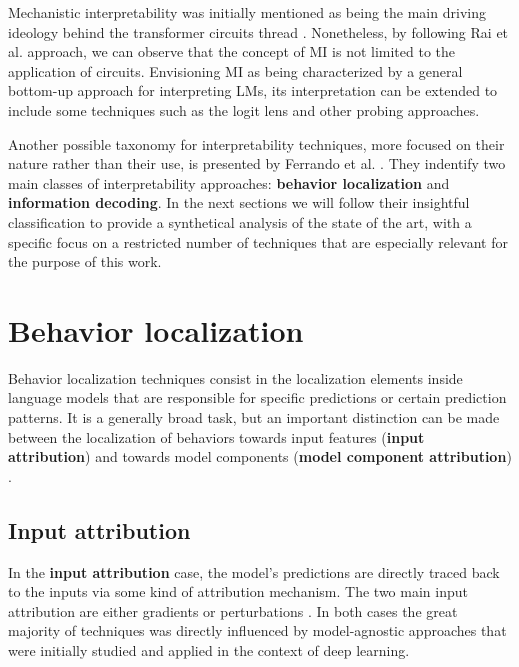 Mechanistic interpretability was initially mentioned as being the main driving ideology behind the transformer circuits thread .
Nonetheless, by following Rai et al.  approach, we can observe that the concept of MI is not limited to the application of circuits.
Envisioning MI as being characterized by a general bottom-up approach for interpreting LMs, its interpretation can be extended to include some  techniques such as the logit lens  and other probing approaches.

Another possible taxonomy for interpretability techniques, more focused on their nature rather than their use, is presented by Ferrando et al. .
They indentify two main classes of interpretability approaches: \textbf{behavior localization} and \textbf{information decoding}.
In the next sections we will follow their insightful classification to provide a synthetical analysis of the state of the art, with a specific focus on a restricted number of techniques that are especially relevant for the purpose of this work.

\section{Behavior localization}

Behavior localization techniques consist in the localization elements inside language models that are responsible for specific predictions or certain prediction patterns.
It is a generally broad task, but an important distinction can be made between the localization of behaviors towards input features (\textbf{input attribution}) and towards model components (\textbf{model component attribution}) . 

\subsection{Input attribution}

In the \textbf{input attribution} case, the model's predictions are directly traced back to the inputs via some kind of attribution mechanism.
The two main input attribution  are either gradients  or perturbations .
In both cases the great majority of techniques was directly influenced by model-agnostic approaches  that were initially studied and applied in the context of deep learning.

